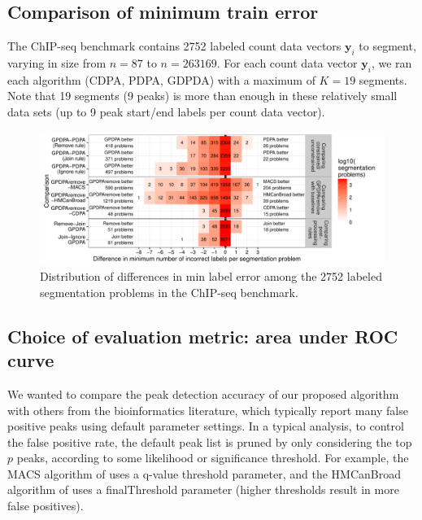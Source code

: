 \documentclass[twoside,11pt]{article}
\begin{document}
\subsection{Comparison of minimum train error}

The ChIP-seq benchmark contains 2752 labeled count data vectors
$\mathbf y_i$ to segment, varying in size from $n=87$ to
$n=263169$. For each count data vector $\mathbf y_i$, we ran each
algorithm (CDPA, PDPA, GDPDA) with a maximum of $K=19$ segments. Note
that 19 segments (9 peaks) is more than enough in these relatively
small data sets (up to 9 peak start/end labels per count data vector).

%   

\begin{figure}
  \centering
  \includegraphics[width=\textwidth]{figure-PDPA-infeasible-error-compare}
  \vspace{-1cm}
  \caption{Distribution of differences in min label error among the
    2752 labeled segmentation problems in the ChIP-seq benchmark.}
  \label{fig:min-train-error}
\end{figure}

\subsection{Choice of evaluation metric: area under ROC curve}

We wanted to compare the peak detection accuracy of our proposed
algorithm with others from the bioinformatics literature, which
typically report many false positive peaks using default parameter
settings. 
In a typical analysis, to control the false
positive rate, the default peak list is pruned by only considering the
top $p$ peaks, according to some likelihood or significance
threshold. For example, the MACS algorithm of \citet{MACS} uses a
q-value threshold parameter, and the HMCanBroad algorithm of
\citet{HMCan} uses a finalThreshold parameter (higher thresholds
result in more false positives).
\end{document}
